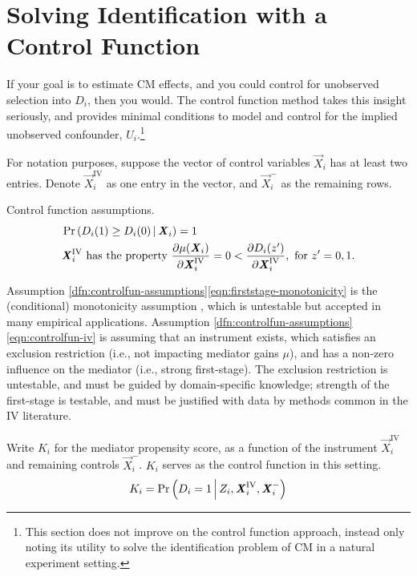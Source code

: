 \section{Solving Identification with a Control Function}
\label{sec:controlfun}
If your goal is to estimate CM effects, and you could control for unobserved selection into $D_i$, then you would.
The control function method takes this insight seriously, and provides minimal conditions to model and control for the implied unobserved confounder, $U_i$.\footnote{
    This section does not improve on the control function approach, instead only noting its utility to solve the identification problem of CM in a natural experiment setting.
}

For notation purposes, suppose the vector of control variables $\vec X_i$ has at least two entries.
Denote $\vec X_i^{\text{IV}}$ as one entry in the vector, and $\vec X_i^-$ as the remaining rows.

\begin{definition}
    \label{dfn:controlfun-assumptions}
    Control function assumptions.
    \begin{align}
        \label{eqn:firststage-monotonicity}
        &\Probgiven{ D_i(1) \geq D_i(0) }{\vec X_i} = 1    \\
        \label{eqn:controlfun-iv}
        &\vec X_i^{\text{IV}} \text{ has the property }
        \partialdiff[\mu(\vec X_i)]{\vec X_i^{\text{IV}}} = 0 < \partialdiff[D_i(z')]{\vec X_i^{\text{IV}}}, \textnormal{ for } z' = 0, 1.
    \end{align}
\end{definition}
Assumption \ref{dfn:controlfun-assumptions}\eqref{eqn:firststage-monotonicity} is the (conditional) monotonicity assumption \citep{imbens1994identification}, which is untestable but accepted in many empirical applications.
Assumption \ref{dfn:controlfun-assumptions}\eqref{eqn:controlfun-iv} is assuming that an instrument exists, which satisfies an exclusion restriction (i.e., not impacting mediator gains $\mu$), and has a non-zero influence on the mediator (i.e., strong first-stage).
The exclusion restriction is untestable, and must be guided by domain-specific knowledge; strength of the first-stage is testable, and must be justified with data by methods common in the IV literature.

Write $K_i$ for the mediator propensity score, as a function of the instrument $\vec X_i^{\text{IV}}$ and remaining controls $\vec X_i^-$.
$K_i$ serves as the control function in this setting.
\[ K_i = \Pr\left( D_i = 1 \, \middle\vert \, Z_i, \boldsymbol{\mathit{X}}_i^{\text{IV}}, \boldsymbol{\mathit{X}}_i^- \right) \]

